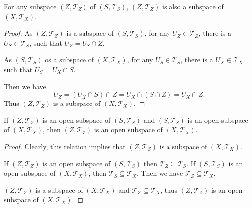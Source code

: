 \begin{proposition}
	For any subspace $(Z, \mathcal T_Z)$ of $(S, \mathcal T_S)$, $(Z, \mathcal T_Z)$ is also a subspace of $(X, \mathcal T_X)$.
	
	\begin{proof}
		As $(Z, \mathcal T_Z)$ is a subspace of $(S, \mathcal T_S)$, for any $U_Z \in \mathcal T_Z$, there is a $U_S \in \mathcal T_S$, such that $U_Z = U_S \cap Z$.
		
		As $(S, \mathcal T_S)$ os a subspace of $(X, \mathcal T_X)$, for any $U_S \in \mathcal T_S$, there is a $U_X \in \mathcal T_X$ such that $U_S = U_X \cap S$.
		
		Then we have
		$$
		U_Z = (U_X \cap S) \cap Z = U_X \cap (S \cap Z) = U_X \cap Z.
		$$
		Thus $(Z, \mathcal T_Z)$ is a subspace of $(X, \mathcal T_X)$.
	\end{proof}
\end{proposition}


\begin{proposition}
	If $(Z, \mathcal T_Z)$ is an open subspace of $(S, \mathcal T_S)$ and $(S, \mathcal T_S)$ is an open subspace of $(X, \mathcal T_X)$, then $(Z, \mathcal T_Z)$ is an open subspace of $(X, \mathcal T_X)$.
	
	\begin{proof}
		Clearly, this relation implies that $(Z, \mathcal T_Z)$ is a subspace of $(X, \mathcal T_X)$.
	
		If $(Z, \mathcal T_Z)$ is an open subspace of $(S, \mathcal T_S)$ then $\mathcal T_Z \subseteq \mathcal T_S$. If $(S, \mathcal T_S)$ is an open subspace of $(X, \mathcal T_X)$, then $\mathcal T_S \subseteq \mathcal T_X$. Then we have $\mathcal T_Z \subseteq \mathcal T_X$.
		
		$(Z, \mathcal T_Z)$ is a subspace of $(X, \mathcal T_X)$ and $\mathcal T_Z \subseteq \mathcal T_X$, thus  $(Z, \mathcal T_Z)$ is an open subspace of $(X, \mathcal T_X)$.
	\end{proof}
\end{proposition}


